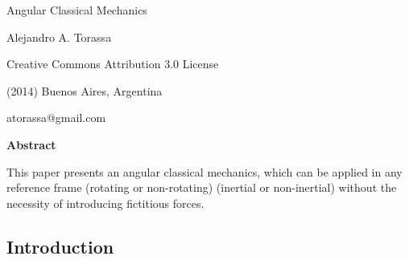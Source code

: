 \documentclass[10pt]{article}
\begin{document}
\begin{center}

{\huge Angular Classical Mechanics}

\bigskip \bigskip

{\large Alejandro A. Torassa}

\bigskip \bigskip

\small

Creative Commons Attribution 3.0 License

(2014) Buenos Aires, Argentina

atorassa@gmail.com

\bigskip \medskip

{\bf Abstract}

\bigskip

\parbox{96mm}{This paper presents an angular classical mechanics, which can be applied in any reference frame (rotating or non-rotating) (inertial or non-inertial) without the necessity of introducing fictitious forces.}

\end{center}

\normalsize

\vspace{-0.30em}

{\centering\subsection*{Introduction}}

\vspace{+1.20em}
\end{document}
